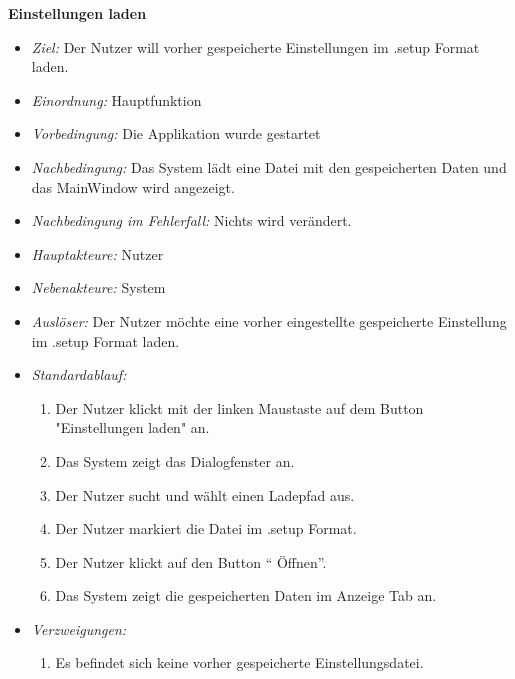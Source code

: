 \textbf{Einstellungen laden}
  \begin{itemize}
  \item \textit{Ziel:} Der Nutzer will vorher gespeicherte Einstellungen im .setup Format laden.
  \item \textit{Einordnung:} Hauptfunktion
  \item \textit{Vorbedingung:} Die Applikation wurde gestartet
  \item \textit{Nachbedingung:} Das System l\"adt eine Datei mit den gespeicherten Daten und das MainWindow wird angezeigt.
    \item \textit{Nachbedingung im Fehlerfall:} Nichts wird ver\"andert.
  \item \textit{Hauptakteure:} Nutzer
  \item \textit{Nebenakteure:} System
  \item \textit{Ausl\"oser:} Der Nutzer m\"ochte eine vorher eingestellte gespeicherte Einstellung im .setup Format laden.
    \item \textit{Standardablauf:}
    \begin{enumerate}
    \item Der Nutzer klickt mit der linken Maustaste auf dem Button "Einstellungen laden" an.
    \item Das System zeigt das Dialogfenster an.
    \item Der Nutzer sucht und w\"ahlt einen Ladepfad aus.
    \item Der Nutzer markiert die Datei im .setup Format.
    \item Der Nutzer klickt auf den Button "` \"Offnen"'.
    \item Das System zeigt die gespeicherten Daten im Anzeige Tab an.
  \end{enumerate}
  \item \textit{Verzweigungen:}
    \begin{enumerate}[label=(3\arabic*)]
\item Es befindet sich keine vorher gespeicherte Einstellungsdatei.
    \end{enumerate}
  \end{itemize}